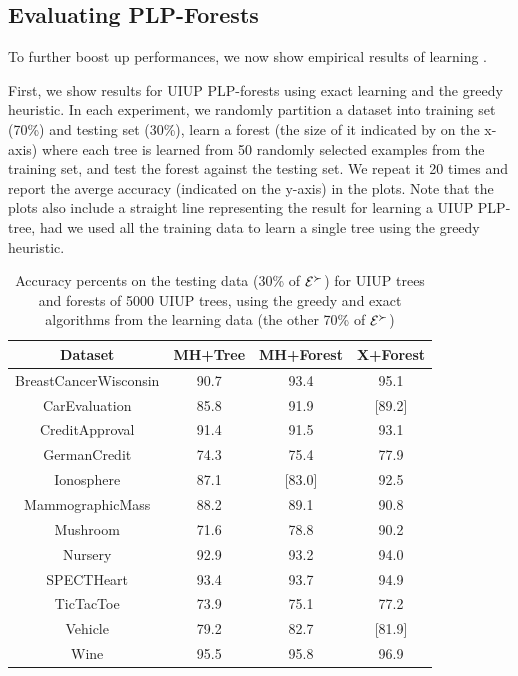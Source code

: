 \subsection{Evaluating PLP-Forests}
To further boost up performances, we now show empirical results
of learning .

First, we show results for UIUP PLP-forests using exact learning
and the greedy heuristic.
In each experiment, we randomly partition a dataset into training
set (70\%) and testing set (30\%), learn a forest (the size of it
indicated by on the x-axis) where
each tree is learned from 50 randomly selected examples from the
training set, and test the forest against the testing set.
We repeat it 20 times and report the averge accuracy (indicated on
the y-axis) in the plots.
Note that the plots also include a straight line representing
the result for learning a UIUP PLP-tree, had we used all the
training data to learn a single tree using the greedy heuristic.

\begin{table}
  \centering
  \small
  \begin{tabular}{ |c||c|c|c| }
    \hline
    Dataset          				& MH+Tree & MH+Forest & X+Forest\\
    \hline \hline
    BreastCancerWisconsin   & 90.7 & 93.4 & 95.1 \\
    \hline                                     
    CarEvaluation           & 85.8 & 91.9 & [89.2] \\
    \hline                                     
    CreditApproval          & 91.4 & 91.5 & 93.1 \\
    \hline                                     
    GermanCredit            & 74.3 & 75.4 & 77.9 \\
    \hline                                     
    Ionosphere              & 87.1 & [83.0] & 92.5 \\
    \hline                                     
    MammographicMass        & 88.2 & 89.1 & 90.8 \\
    \hline                                     
    Mushroom                & 71.6 & 78.8 & 90.2 \\
    \hline                                     
    Nursery                 & 92.9 & 93.2 & 94.0 \\
    \hline                                     
    SPECTHeart              & 93.4 & 93.7 & 94.9 \\
    \hline                                     
    TicTacToe               & 73.9 & 75.1 & 77.2 \\
    \hline                                     
    Vehicle                 & 79.2 & 82.7 & [81.9] \\
    \hline                                     
    Wine                    & 95.5 & 95.8 & 96.9 \\
    \hline
  \end{tabular}
  \caption{Accuracy percents on the testing data (30\% of $\mathcal{E}^\succ$)
					 for UIUP trees and forests of 5000 UIUP trees, 
					 using the greedy and exact algorithms from the learning 
					 data (the other 70\% of $\mathcal{E}^\succ$)}
  \label{tbl:forests1}
\end{table}

